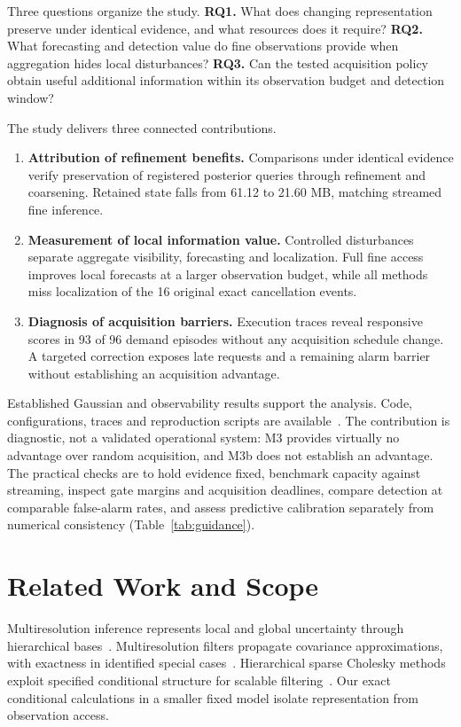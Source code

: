 \documentclass[conference]{IEEEtran}
\begin{document}
Three questions organize the study. \textbf{RQ1.} What does changing representation preserve under identical evidence, and what resources does it require? \textbf{RQ2.} What forecasting and detection value do fine observations provide when aggregation hides local disturbances? \textbf{RQ3.} Can the tested acquisition policy obtain useful additional information within its observation budget and detection window?

The study delivers three connected contributions.
\begin{enumerate}
\item \textbf{Attribution of refinement benefits.} Comparisons under identical evidence verify preservation of registered posterior queries through refinement and coarsening. Retained state falls from 61.12 to 21.60 MB, matching streamed fine inference.
\item \textbf{Measurement of local information value.} Controlled disturbances separate aggregate visibility, forecasting and localization. Full fine access improves local forecasts at a larger observation budget, while all methods miss localization of the 16 original exact cancellation events.
\item \textbf{Diagnosis of acquisition barriers.} Execution traces reveal responsive scores in 93 of 96 demand episodes without any acquisition schedule change. A targeted correction exposes late requests and a remaining alarm barrier without establishing an acquisition advantage.
\end{enumerate}

Established Gaussian and observability results support the analysis. Code, configurations, traces and reproduction scripts are available~\cite{artifact}. The contribution is diagnostic, not a validated operational system: M3 provides virtually no advantage over random acquisition, and M3b does not establish an advantage. The practical checks are to hold evidence fixed, benchmark capacity against streaming, inspect gate margins and acquisition deadlines, compare detection at comparable false-alarm rates, and assess predictive calibration separately from numerical consistency (Table~\ref{tab:guidance}).



\section{Related Work and Scope}
Multiresolution inference represents local and global uncertainty through hierarchical bases~\cite{katzfuss2017}. Multiresolution filters propagate covariance approximations, with exactness in identified special cases~\cite{mrf}. Hierarchical sparse Cholesky methods exploit specified conditional structure for scalable filtering~\cite{vecchia}. Our exact conditional calculations in a smaller fixed model isolate representation from observation access.
\end{document}
